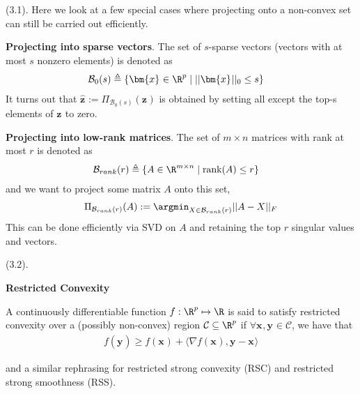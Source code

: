 \documentclass[11pt]{article}
\renewcommand\vec[2][]{\bm{#2}_{#1}}
\newcommand\myspace[1][]{\vspace{#1\bigskipamount}}
\newcommand\p{\Needspace{10\baselineskip} \noindent}
\begin{document}
\p {} (3.1). Here we look at a few special cases where projecting onto a non-convex set can still be carried out efficiently. 
\begin{compactitem}
	\item \textbf{Projecting into sparse vectors}. The set of $s$-sparse vectors (vectors with at most $s$ nonzero elements) is denoted as
	\begin{align}
		\mathcal{B}_0(s) 
			&\triangleq \{ \vec x  \in \R^p \mid ||\vec x ||_0 \le s   \}
	\end{align}
	It turns out that $\hat{\vec z} := \Pi_{\mathcal{B}_0(s)}(\vec z)$ is obtained by setting all except the top-s elements of $\vec z$ to zero. 
	
	\item \textbf{Projecting into low-rank matrices}. The set of $m \times n$ matrices with rank at most $r$ is denoted as
	\begin{align}
		\mathcal{B}_{rank}(r) 
			&\triangleq \{
				A \in \R^{m \times n} \mid
				\text{rank}(A) \le r
			\}
	\end{align}
	and we want to project some matrix $A$ onto this set,
	\begin{align}
		\Pi_{\mathcal{B}_{rank}(r)}(A)
			:= \argmin_{X \in \mathcal{B}_{rank}(r)} ||A - X||_F
	\end{align}
	This can be done efficiently via SVD on $A$ and retaining the top $r$ singular values and vectors.
\end{compactitem}


\myspace
\p {} (3.2).

\textbf{Restricted Convexity}
\begin{definition}[-1em]
	A continuously differentiable function $f : \R^p \mapsto \R$ is said to satisfy restricted convexity over a (possibly non-convex) region $\mathcal C \subseteq \R^p$ if $\forall \vec x, \vec y \in \mathcal C$, we have that
	\begin{align}
	f(\vec y) \ge f(\vec x) + \langle \nabla f(\vec x), \vec y - \vec x \rangle 
	\end{align}
\end{definition}
and a similar rephrasing for restricted strong convexity (RSC) and restricted strong smoothness (RSS). 
\end{document}
